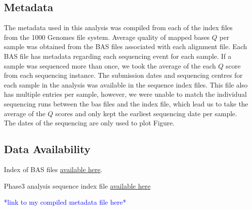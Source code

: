 \documentclass[9pt,lineno]{elife}
\newcommand{\todo}[1]{\textcolor{blue}{*#1*}}
\begin{document}
\subsection{Metadata}
The metadata used in this analysis was compiled from each of the index files from the 1000 Genomes file system. 
Average quality of mapped bases $Q$ per sample was obtained from the BAS files associated with each alignment file. 
Each BAS file has metadata regarding each sequencing event for each sample. 
If a sample was sequenced more than once, we took the average of the each $Q$ score from each sequencing instance. 
The submission dates and sequencing centres for each sample in the analysis was available in the sequence index files.  
This file also has multiple entries per sample, however, we were unable to match the individual sequencing runs between the bas files and the index file, which lead us to take the average of the $Q$ scores and only kept the earliest sequencing date per sample. 
The dates of the sequencing are only used to plot Figure.

\subsection{Data Availability}

Index of BAS files \href{http://ftp.1000genomes.ebi.ac.uk/vol1/ftp/data_collections/1000_genomes_project/1000genomes.low_coverage.GRCh38DH.alignment.index}{available here}.

Phase3 analysis sequence index file  \href{http://ftp.1000genomes.ebi.ac.uk/vol1/ftp/phase3/20130502.phase3.analysis.sequence.index}{available here} 

\todo{link to my compiled metadata file here}
\end{document}
